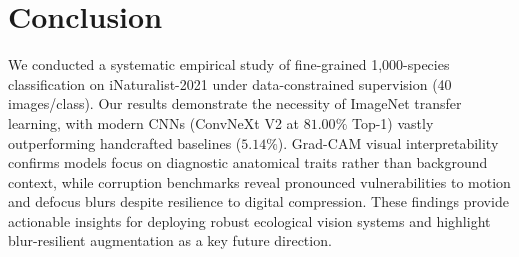 \section{Conclusion}
\label{sec:conclusion}

We conducted a systematic empirical study of fine-grained 1{,}000-species classification on iNaturalist-2021 under data-constrained supervision (40 images/class). Our results demonstrate the necessity of ImageNet transfer learning, with modern CNNs (ConvNeXt V2 at $81.00\%$ Top-1) vastly outperforming handcrafted baselines ($5.14\%$). Grad-CAM visual interpretability confirms models focus on diagnostic anatomical traits rather than background context, while corruption benchmarks reveal pronounced vulnerabilities to motion and defocus blurs despite resilience to digital compression. These findings provide actionable insights for deploying robust ecological vision systems and highlight blur-resilient augmentation as a key future direction.